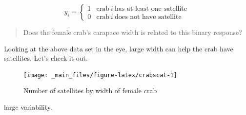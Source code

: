 \documentclass[]{book}
\newenvironment{Shaded}{\begin{snugshade}}{\end{snugshade}}
\newcommand{\DataTypeTok}[1]{\textcolor[rgb]{0.13,0.29,0.53}{#1}}
\newcommand{\DecValTok}[1]{\textcolor[rgb]{0.00,0.00,0.81}{#1}}
\newcommand{\KeywordTok}[1]{\textcolor[rgb]{0.13,0.29,0.53}{\textbf{#1}}}
\newcommand{\NormalTok}[1]{#1}
\newcommand{\OperatorTok}[1]{\textcolor[rgb]{0.81,0.36,0.00}{\textbf{#1}}}
\newcommand{\OtherTok}[1]{\textcolor[rgb]{0.56,0.35,0.01}{#1}}
\newcommand{\StringTok}[1]{\textcolor[rgb]{0.31,0.60,0.02}{#1}}
\begin{document}
\[y_i = \begin{cases} 1 & \text{crab}\: i \:\text{has at least one satellite} \\ 0 & \text{crab}\: i \:\text{does not have satellite} \end{cases}\]

\begin{quote}
Does the female crab's carapace width is related to this binary response?
\end{quote}

Looking at the above data set in the eye, large width can help the crab have satellites. Let's check it out.

\begin{Shaded}
\end{Shaded}

\begin{figure}[H]

{\centering \texttt{[image: \_main\_files/figure-latex/crabscat-1]} 

}

\caption{Number of satellites by width of female crab\label{crabscat}}\label{fig:crabscat}
\end{figure}

large variability.

\begin{Shaded}
\end{Shaded}
\end{document}
